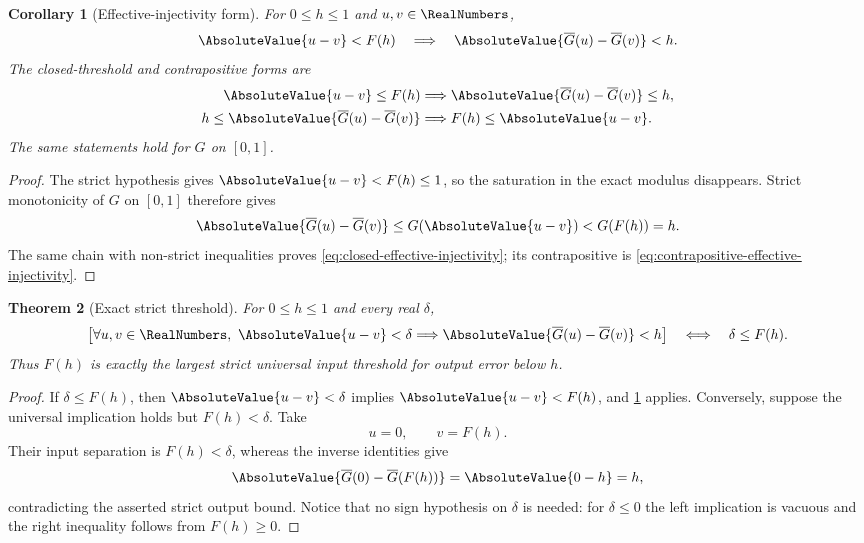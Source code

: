 \documentclass[11pt,oneside]{article}
\newtheorem{theorem}{Theorem}[section]
\newtheorem{corollary}[theorem]{Corollary}
\theoremstyle{definition}
\theoremstyle{remark}
\numberwithin{equation}{section}
\newcommand{\InvT}{\overline G}
\begin{document}
\begin{corollary}[Effective-injectivity form]\label{cor:effective-injectivity}
For $0\le h\le1$ and $u,v\in\RealNumbers$,
\begin{equation}\label{eq:effective-injectivity}
 \AbsoluteValue{u-v}<F(h)
 \quad\Longrightarrow\quad
 \AbsoluteValue{\InvT(u)-\InvT(v)}<h.
\end{equation}
The closed-threshold and contrapositive forms are
\begin{align}
 \AbsoluteValue{u-v}\le F(h)
 &\Longrightarrow \AbsoluteValue{\InvT(u)-\InvT(v)}\le h,
 \label{eq:closed-effective-injectivity}\\
 h\le\AbsoluteValue{\InvT(u)-\InvT(v)}
 &\Longrightarrow F(h)\le\AbsoluteValue{u-v}.
 \label{eq:contrapositive-effective-injectivity}
\end{align}
The same statements hold for $G$ on $[0,1]$.
\end{corollary}

\begin{proof}
The strict hypothesis gives
$\AbsoluteValue{u-v}<F(h)\le1$, so the saturation in the exact modulus disappears.
Strict monotonicity of $G$ on $[0,1]$ therefore gives
\[
 \AbsoluteValue{\InvT(u)-\InvT(v)}
 \le G(\AbsoluteValue{u-v})<G(F(h))=h.
\]
The same chain with non-strict inequalities proves
\eqref{eq:closed-effective-injectivity}; its contrapositive is
\eqref{eq:contrapositive-effective-injectivity}.
\end{proof}

\begin{theorem}[Exact strict threshold]\label{thm:exact-strict-threshold}
For $0\le h\le1$ and every real $\delta$,
\begin{equation}\label{eq:exact-strict-threshold}
 \left[
   \forall u,v\in\RealNumbers,
   \ \AbsoluteValue{u-v}<\delta
   \Longrightarrow
   \AbsoluteValue{\InvT(u)-\InvT(v)}<h
 \right]
 \quad\Longleftrightarrow\quad
 \delta\le F(h).
\end{equation}
Thus $F(h)$ is exactly the largest strict universal input threshold for output
error below $h$.
\end{theorem}

\begin{proof}
If $\delta\le F(h)$, then
$\AbsoluteValue{u-v}<\delta$ implies $\AbsoluteValue{u-v}<F(h)$, and
\cref{cor:effective-injectivity} applies.  Conversely, suppose the universal
implication holds but $F(h)<\delta$.  Take
\[
 u=0,\qquad v=F(h).
\]
Their input separation is $F(h)<\delta$, whereas the inverse identities give
\[
 \AbsoluteValue{\InvT(0)-\InvT(F(h))}=\AbsoluteValue{0-h}=h,
\]
contradicting the asserted strict output bound.  Notice that no sign
hypothesis on $\delta$ is needed: for $\delta\le0$ the left implication is
vacuous and the right inequality follows from $F(h)\ge0$.
\end{proof}
\end{document}
